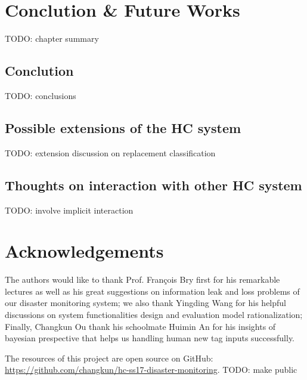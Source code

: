 \section{Conclution \& Future Works}

TODO: chapter summary

\subsection{Conclution}

TODO: conclusions

\subsection{Possible extensions of the HC system}

TODO: extension discussion on replacement classification

\subsection{Thoughts on interaction with other HC system}

TODO: involve implicit interaction

\section*{Acknowledgements}
The authors would like to thank Prof. Fran\c{c}ois Bry first for his remarkable lectures as well as
his great suggestions on information leak and loss problems of our disaster monitoring system;
we also thank Yingding Wang for his helpful discussions on system functionalities design 
and evaluation model rationalization;
Finally, Changkun Ou thank his schoolmate Huimin An for his insights of bayesian prespective that
helps us handling human new tag inputs successfully.

The resources of this project are open source on GitHub: \\
\url{https://github.com/changkun/hc-ss17-disaster-monitoring}.
TODO: make public